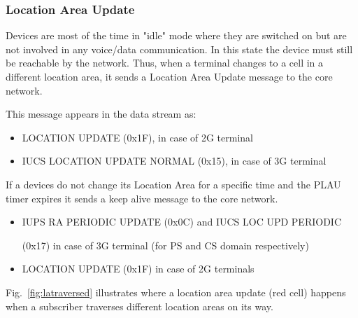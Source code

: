 \documentclass[master,english]{hgbthesis}
\begin{document}
\subsubsection{Location Area Update}

Devices are most of the time in "idle" mode where they are switched on but are not involved in any voice/data communication. In this state the device must still be reachable by the network. Thus, when a terminal changes to a cell in a different location area, it sends a Location Area Update message to the core network.

This message appears in the data stream as:

\begin{itemize}

	\item LOCATION UPDATE (0x1F), in case of 2G terminal

	\item IUCS LOCATION UPDATE NORMAL (0x15), in case of 3G terminal

\end{itemize}

If a devices do not change its Location Area for a specific time and the PLAU timer expires it sends a keep alive message to the core network.

\begin{itemize}

	\item IUPS RA PERIODIC UPDATE (0x0C) and IUCS LOC UPD PERIODIC

	      (0x17) in case of 3G terminal (for PS and CS domain respectively)

	\item LOCATION UPDATE (0x1F) in case of 2G terminals

\end{itemize}

Fig.~\ref{fig:latraversed} illustrates where a location area update (red cell) happens when a subscriber traverses different location areas on its way.





% 


\end{document}
